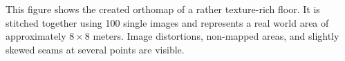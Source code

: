 \label{fig:orthomap}
This figure shows
    the created orthomap of a rather texture-rich floor. It is
    stitched together using 100 single images and represents a
    real world area of approximately $8\times8$ meters. Image
    distortions, non-mapped areas, and slightly skewed seams at
    several points are visible.%
